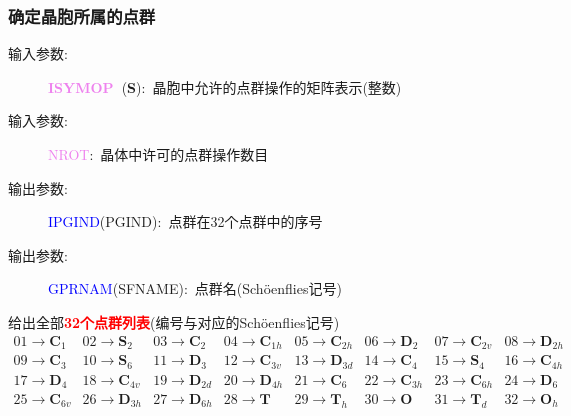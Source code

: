 \documentclass{article}      %
\begin{document}
\subsubsection{确定晶胞所属的点群}
\begin{description}
	\item[输入参数:~]\textcolor{violet}{\textbf{ISYMOP~}}(\textbf{S}):~晶胞中允许的点群操作的矩阵表示(整数)
	\item[输入参数:~]\textcolor{violet}{\textrm{NROT}}:~晶体中许可的点群操作数目
	\item[输出参数:~]\textcolor{blue}{\textrm{IPGIND}}(\textrm{PGIND}):~点群在32个点群中的序号
	\item[输出参数:~]\textcolor{blue}{\textrm{GPRNAM}}(\textrm{SFNAME}):~点群名(\textrm{Sch\"oenflies}记号)
\end{description}
给出全部\textcolor{red}{\textbf{32个点群列表}}(编号与对应的\textrm{Sch\"oenflies}记号) 
\begin{displaymath}
	\begin{matrix}
		01\rightarrow\mathbf{C}_1 &02\rightarrow\mathbf{S}_2 &03\rightarrow\mathbf{C}_2 &04\rightarrow\mathbf{C}_{1h} &05\rightarrow\mathbf{C}_{2h} &06\rightarrow\mathbf{D}_2 &07\rightarrow\mathbf{C}_{2v} &08\rightarrow\mathbf{D}_{2h}\\
		09\rightarrow\mathbf{C}_3 &10\rightarrow\mathbf{S}_6 &11\rightarrow\mathbf{D}_3 &12\rightarrow\mathbf{C}_{3v} &13\rightarrow\mathbf{D}_{3d} &14\rightarrow\mathbf{C}_4 &15\rightarrow\mathbf{S}_4 &16\rightarrow\mathbf{C}_{4h}\\
		17\rightarrow\mathbf{D}_4 &18\rightarrow\mathbf{C}_{4v} &19\rightarrow\mathbf{D}_{2d} &20\rightarrow\mathbf{D}_{4h} &21\rightarrow\mathbf{C}_6 &22\rightarrow\mathbf{C}_{3h} &23\rightarrow\mathbf{C}_{6h} &24\rightarrow\mathbf{D}_6\\
		25\rightarrow\mathbf{C}_{6v} &26\rightarrow\mathbf{D}_{3h} &27\rightarrow\mathbf{D}_{6h} &28\rightarrow\mathbf{T} &29\rightarrow\mathbf{T}_h &30\rightarrow\mathbf{O} &31\rightarrow\mathbf{T}_d &32\rightarrow\mathbf{O}_{h}
	\end{matrix}
\end{displaymath}
\end{document}
